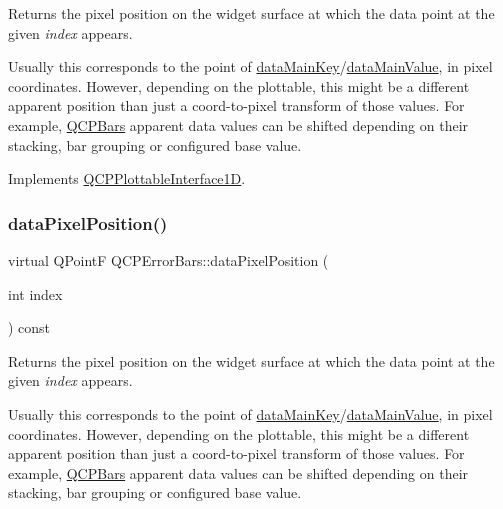 Returns the pixel position on the widget surface at which the data point at the given {\itshape index} appears.

Usually this corresponds to the point of \hyperlink{class_q_c_p_error_bars_ae3931213f76cd34a824c42c22a1dca74}{data\+Main\+Key}/\hyperlink{class_q_c_p_error_bars_a88cd90280366b44c2159774bfb7c473a}{data\+Main\+Value}, in pixel coordinates. However, depending on the plottable, this might be a different apparent position than just a coord-\/to-\/pixel transform of those values. For example, \hyperlink{class_q_c_p_bars}{Q\+C\+P\+Bars} apparent data values can be shifted depending on their stacking, bar grouping or configured base value. 

Implements \hyperlink{class_q_c_p_plottable_interface1_d_a78911838cfbcfd2d8df9ad2fdbfb8e93}{Q\+C\+P\+Plottable\+Interface1D}.

\mbox{\label{class_q_c_p_error_bars_ac50601b6860b0801e2d127dfa5709bc8}} 
\subsubsection{\texorpdfstring{data\+Pixel\+Position()}{dataPixelPosition()}\hspace{0.1cm}{\footnotesize\ttfamily [2/2]}}
{\footnotesize\ttfamily virtual Q\+PointF Q\+C\+P\+Error\+Bars\+::data\+Pixel\+Position (\begin{DoxyParamCaption}\item[{int}]{index }\end{DoxyParamCaption}) const\hspace{0.3cm}{\ttfamily [virtual]}}

Returns the pixel position on the widget surface at which the data point at the given {\itshape index} appears.

Usually this corresponds to the point of \hyperlink{class_q_c_p_error_bars_ae3931213f76cd34a824c42c22a1dca74}{data\+Main\+Key}/\hyperlink{class_q_c_p_error_bars_a88cd90280366b44c2159774bfb7c473a}{data\+Main\+Value}, in pixel coordinates. However, depending on the plottable, this might be a different apparent position than just a coord-\/to-\/pixel transform of those values. For example, \hyperlink{class_q_c_p_bars}{Q\+C\+P\+Bars} apparent data values can be shifted depending on their stacking, bar grouping or configured base value. 

